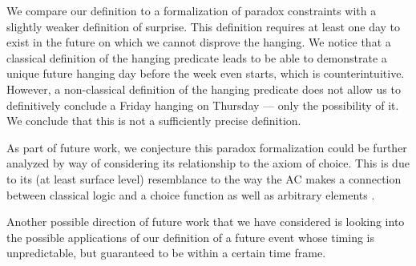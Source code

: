 \documentclass[runningheads]{llncs}
\newenvironment{myindent}{\begin{adjustwidth}{1cm}{}}{\end{adjustwidth}}
\begin{document}
We compare our definition to a formalization of paradox constraints with a slightly
weaker definition of surprise. This definition requires at least one day to
exist in the future on which we cannot disprove the hanging. We notice that a classical
definition of the hanging predicate leads to be able to demonstrate a unique
future hanging day before the week even starts, which is counterintuitive.
However, a non-classical
definition of the hanging predicate does not allow us to definitively conclude a Friday
hanging on Thursday --- only the possibility of it. We conclude that this
is not a sufficiently precise definition.

As part of future work, we conjecture this paradox formalization could be further analyzed by way of considering its
relationship to the axiom of choice. This is due to its (at least surface level)
resemblance to the way the AC makes a connection between classical logic
and a choice function \cite{accomp} as well as arbitrary elements \cite{randomness}.

Another possible direction of future work that we have considered is looking into the
possible applications of our definition of a future event whose timing is unpredictable,
but guaranteed to be within a certain time frame.

%
\end{document}
